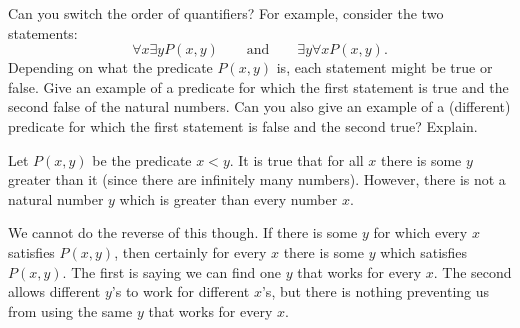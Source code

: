 \begin{questions}
\question Can you switch the order of quantifiers?  For example, consider the two statements:
\[\forall x \exists y P(x,y) \qquad \mathrm{ and } \qquad \exists y \forall x P(x,y).\]
Depending on what the predicate $P(x,y)$ is, each statement might be true or false.  Give an example of a predicate for which the first statement is true and the second false of the natural numbers.  Can you also give an example of a (different) predicate for which the first statement is false and the second true?  Explain.

	\begin{answer}
		Let $P(x,y)$ be the predicate $x < y$.  It is true that for all $x$ there is some $y$ greater than it (since there are infinitely many numbers).  However, there is not a natural number $y$ which is greater than every number $x$.

		We cannot do the reverse of this though.  If there is some $y$ for which every $x$ satisfies $P(x,y)$, then certainly for every $x$ there is some $y$ which satisfies $P(x,y)$.  The first is saying we can find one $y$ that works for every $x$.  The second allows different $y$'s to work for different $x$'s, but there is nothing preventing us from using the same $y$ that works for every $x$.
	\end{answer}








\end{questions}
